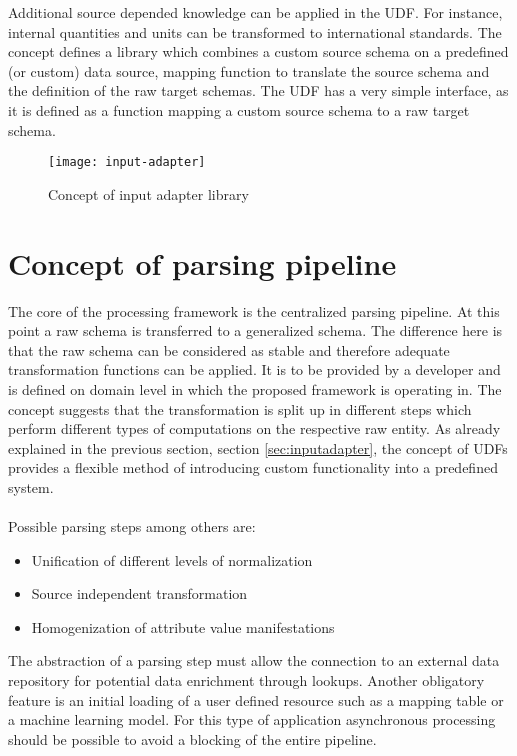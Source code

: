 Additional source depended knowledge can be applied in the UDF. For instance, internal quantities and units can be transformed to international standards. The concept defines a library which combines a custom source schema on a predefined (or custom) data source, mapping function to translate the source schema and the definition of the raw target schemas. The UDF has a very simple interface, as it is defined as a function mapping a custom source schema to a raw target schema. 

\begin{figure}[htb]
  \centering
  \texttt{[image: input-adapter]}\\
  \caption{Concept of input adapter library}
  \label{fig:inputadapter}
\end{figure}

\section{Concept of parsing pipeline\label{sec:ppln}}

The core of the processing framework is the centralized parsing pipeline. At this point a raw schema is transferred to a generalized schema. The difference here is that the raw schema can be considered as stable and therefore adequate transformation functions can be applied. It is to be provided by a developer and is defined on domain level in which the proposed framework is operating in. The concept suggests that the transformation is split up in different steps which perform different types of computations on the respective raw entity. As already explained in the previous section, section \ref{sec:inputadapter}, the concept of UDFs provides a flexible method of introducing custom functionality into a predefined system.
\\\\
Possible parsing steps among others are:
\begin{itemize}
\item Unification of different levels of normalization
\item Source independent transformation
\item Homogenization of attribute value manifestations
\end{itemize}

The abstraction of a parsing step must allow the connection to an external data repository for potential data enrichment through lookups. Another obligatory feature is an initial loading of a user defined resource such as a mapping table or a machine learning model. For this type of application asynchronous processing should be possible to avoid a blocking of the entire pipeline.

